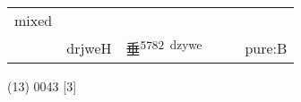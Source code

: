 \documentclass[14pt,a4paper]{scrartcl}
\begin{document}
\begin{longtable}[c]{@{}llllll@{}}
\begin{minipage}[t]{0.14\columnwidth}\raggedright\strut
mixed
\strut\end{minipage}\tabularnewline
\begin{minipage}[t]{0.14\columnwidth}\raggedright\strut
𠂹
\strut\end{minipage} &
\begin{minipage}[t]{0.14\columnwidth}\raggedright\strut
drjweH
\strut\end{minipage} &
\begin{minipage}[t]{0.14\columnwidth}\raggedright\strut
垂\textsuperscript{5782~dzywe}
\strut\end{minipage} &
\begin{minipage}[t]{0.14\columnwidth}\raggedright\strut
\strut\end{minipage} &
\begin{minipage}[t]{0.14\columnwidth}\raggedright\strut
\strut\end{minipage} &
\begin{minipage}[t]{0.14\columnwidth}\raggedright\strut
pure:B
\strut\end{minipage}\tabularnewline
\bottomrule
\end{longtable}

(13) 0043 {[}3{]}
\end{document}

